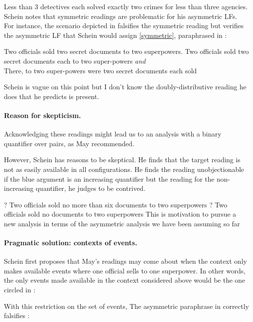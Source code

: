\documentclass[english]{article}
\newcommand{\fg}{\color{darkred}}
\newcommand{\bg}{\color{blueish}}
\begin{document}
\ex
{\fg Less than 3 detectives} each solved {\bg exactly two crimes} for {\fg less than three agencies}.
\xe
%
Schein notes that symmetric readings are problematic for his asymmetric LFs. For instance, the scenario depicted in \cnextxc falsifies the symmetric reading but verifies the asymmetric LF that Schein would assign \cref{symmetric}, paraphrased in \cnextxb:

\pex
\a 
{\fg Two officials} sold {\bg two secret documents} to {\fg two superpowers}.\label{symmetric}
\a
Two officials sold two secret documents each to two super-powers \emph{and}\\
There, to two super-powers were two secret documents each sold
\a 

\xe
%
Schein is vague on this point but I don't know the doubly-distributive reading he does that he predicts is present.

\paragraph{Reason for skepticism.} 
Acknowledging these readings might lead us to an analysis with a binary quantifier over pairs, as May recommended.

However, Schein has reasons to be skeptical. He finds that the target reading is not as easily available in all configurations.
He finds the reading unobjectionable if the {\bg blue} argument is an increasing quantifier but the reading for the non-increasing quantifier, he judges to be contrived.

\pex
\a 
\ljudge? {\fg Two officials} sold {\bg no more than six documents} to {\fg two superpowers}
\a 
\ljudge? {\fg Two officials} sold {\bg no documents} to {\fg two superpowers}
\xe
%
This is motivation to pursue a new analysis in terms of the asymmetric analysis we have been assuming so far

\paragraph{Pragmatic solution: contexts of events.} Schein first proposes that May's readings may come about when the context only makes available events where one official sells to one superpower. In other words, the only events made available in the context considered above would be the one circled in \cnextx:

\ex

\xe
%
With this restriction on the set of events, 
The asymmetric paraphrase in \cnextxb correctly falsifies \cnextxa:
\end{document}
